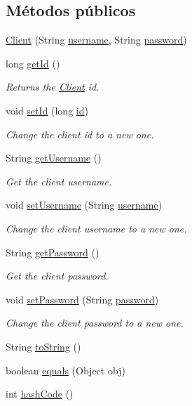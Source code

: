 \subsection*{Métodos públicos}
\begin{DoxyCompactItemize}
\item 
\mbox{\hyperlink{a00164_a57bf8892cfbb684bcda11d6bb786871b}{Client}} (String \mbox{\hyperlink{a00164_a0d105bbb8e72c4a5b70ec43f59227882}{username}}, String \mbox{\hyperlink{a00164_a1914bdf0282fd4a34b890a6fb775619e}{password}})
\item 
long \mbox{\hyperlink{a00164_a522bbbbe3b397983a76056b4350126df}{get\+Id}} ()
\begin{DoxyCompactList}\small\item\em Returns the \mbox{\hyperlink{a00164}{Client}} id. \end{DoxyCompactList}\item 
void \mbox{\hyperlink{a00164_a0e4914e375b61e50427b5fbd15c0948f}{set\+Id}} (long \mbox{\hyperlink{a00164_ab353a203ee0d84148e34fbb27ff0dbb8}{id}})
\begin{DoxyCompactList}\small\item\em Change the client id to a new one. \end{DoxyCompactList}\item 
String \mbox{\hyperlink{a00164_a0ae33acded961afcf93152d917bf1aa1}{get\+Username}} ()
\begin{DoxyCompactList}\small\item\em Get the client username. \end{DoxyCompactList}\item 
void \mbox{\hyperlink{a00164_acf233b95ed06204b7724cc7d277352ab}{set\+Username}} (String \mbox{\hyperlink{a00164_a0d105bbb8e72c4a5b70ec43f59227882}{username}})
\begin{DoxyCompactList}\small\item\em Change the client username to a new one. \end{DoxyCompactList}\item 
String \mbox{\hyperlink{a00164_a5ecd4e7fd82dec1d7348730379be6b54}{get\+Password}} ()
\begin{DoxyCompactList}\small\item\em Get the client password. \end{DoxyCompactList}\item 
void \mbox{\hyperlink{a00164_a89d703e0377510769b326334f31fbb8d}{set\+Password}} (String \mbox{\hyperlink{a00164_a1914bdf0282fd4a34b890a6fb775619e}{password}})
\begin{DoxyCompactList}\small\item\em Change the client password to a new one. \end{DoxyCompactList}\item 
String \mbox{\hyperlink{a00164_a9af93d16608b629f3606f859b0ec85e9}{to\+String}} ()
\item 
boolean \mbox{\hyperlink{a00164_acf199d84c39f08cea14078ef175be9f5}{equals}} (Object obj)
\item 
int \mbox{\hyperlink{a00164_aaa86bcfe5247f3aeae9daec9600cf70c}{hash\+Code}} ()
\end{DoxyCompactItemize}
